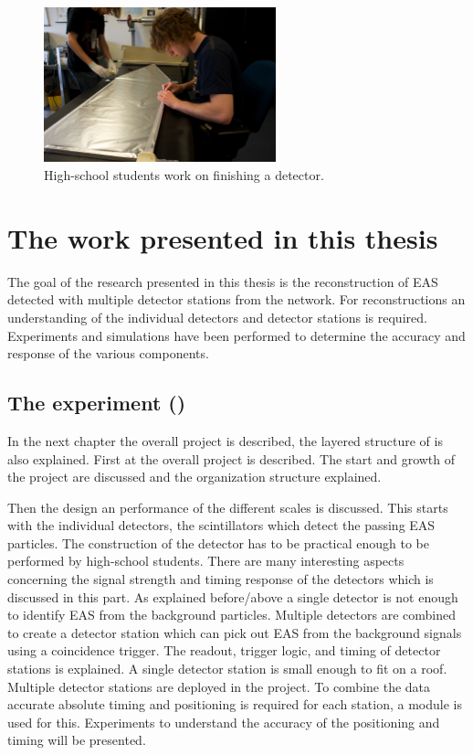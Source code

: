 \begin{figure}
    \centering
    \includegraphics[width=0.6\textwidth]
                    {plots/cosmic-rays/ADL_100352}
    \caption{High-school students work on finishing a detector.}
    \label{fig:detector-bouw}
\end{figure}


\section{The work presented in this thesis}

The goal of the research presented in this thesis is the reconstruction of EAS detected with multiple detector stations from the \hisparc network. For reconstructions an understanding of the individual detectors and detector stations is required. Experiments and simulations have been performed to determine the accuracy and response of the various components.


\subsection{The \hisparc experiment
            ()}

In the next chapter the overall project is described, the layered structure of \hisparc is also explained. First at the overall project is described. The start and growth of the project are discussed and the organization structure explained.

Then the design an performance of the different scales is discussed. This starts with the individual detectors, the scintillators which detect the passing EAS particles. The construction of the detector has to be practical enough to be performed by high-school students. There are many interesting aspects concerning the signal strength and timing response of the detectors which is discussed in this part. As explained before/above a single detector is not enough to identify EAS from the background particles. Multiple detectors are combined to create a detector station which can pick out EAS from the background signals using a coincidence trigger. The readout, trigger logic, and timing of detector stations is explained. A single detector station is small enough to fit on a roof. Multiple detector stations are deployed in the \hisparc project. To combine the data accurate absolute timing and positioning is required for each station, a \gps module is used for this. Experiments to understand the accuracy of the \gps positioning and timing will be presented.


